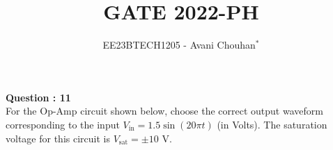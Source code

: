 \documentclass[journal,12pt,twocolumn]{IEEEtran}
\begin{document}

\vspace{3cm}

\title{GATE 2022-PH}
\author{EE23BTECH1205 - Avani Chouhan$^{*}$}
\maketitle
\newpage
\bigskip

\renewcommand{\thefigure}{\theenumi}
\renewcommand{\thetable}{\theenumi}

\vspace{3cm}
\textbf{Question : 11} \\
For the Op-Amp circuit shown below, choose the correct output waveform corresponding to the input \( V_{\text{in}} = 1.5 \sin(20 \pi t) \) (in Volts). The saturation voltage for this circuit is \( V_{\text{sat}} = \pm 10 \) V.
\begin{figure}[htb]
\centering
    
    \label{fig:1}
\end{figure}
\end{document}
